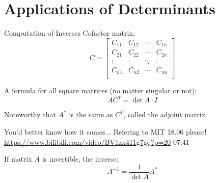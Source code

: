 \documentclass{beamer}
\begin{document}
\section{Applications of Determinants}
\begin{frame}{Computation of Inverses}
Cofactor matrix:
\begin{equation*}
    C=\left[ \begin{matrix}
        C_{11}&		C_{12}&		\cdots&		C_{1n}\\
        C_{21}&		C_{22}&		\cdots&		C_{2n}\\
        \vdots&		\vdots&		\ddots&		\vdots\\
        C_{n1}&		C_{n2}&		\cdots&		C_{nn}\\
    \end{matrix} \right]
\end{equation*}


A formula for all square matrices (no matter singular or not):
\begin{equation*}
    AC^T=\det A \cdot I
\end{equation*}

Noteworthy that $A^*$ is the same as $C^T$, called the adjoint matrix.

\vspace{3pt}
You'd better know how it comes... Refering to MIT 18.06 please!
\url{https://www.bilibili.com/video/BV1zx411g7gq?p=20} 07:41

\vspace{3pt}
If matrix $A$ is invertible, the inverse:
\begin{equation*}
    A^{-1}=\frac{1}{\det A}A^*
\end{equation*}

\end{frame}
\end{document}
